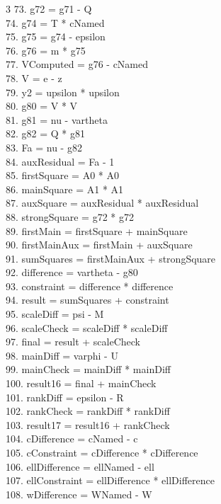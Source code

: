 \documentclass[10pt]{article}
\begin{document}
\begin{multicols}{3}
73. g72 = g71 - Q\\
74. g74 = T * cNamed\\
75. g75 = g74 - epsilon\\
76. g76 = m * g75\\
77. VComputed = g76 - cNamed\\
78. V = e - z\\
79. y2 = upsilon * upsilon\\
80. g80 = V * V\\
81. g81 = nu - vartheta\\
82. g82 = Q * g81\\
83. Fa = nu - g82\\
84. auxResidual = Fa - 1\\
85. firstSquare = A0 * A0\\
86. mainSquare = A1 * A1\\
87. auxSquare = auxResidual * auxResidual\\
88. strongSquare = g72 * g72\\
89. firstMain = firstSquare + mainSquare\\
90. firstMainAux = firstMain + auxSquare\\
91. sumSquares = firstMainAux + strongSquare\\
92. difference = vartheta - g80\\
93. constraint = difference * difference\\
94. result = sumSquares + constraint\\
95. scaleDiff = psi - M\\
96. scaleCheck = scaleDiff * scaleDiff\\
97. final = result + scaleCheck\\
98. mainDiff = varphi - U\\
99. mainCheck = mainDiff * mainDiff\\
100. result16 = final + mainCheck\\
101. rankDiff = epsilon - R\\
102. rankCheck = rankDiff * rankDiff\\
103. result17 = result16 + rankCheck\\
104. cDifference = cNamed - c\\
105. cConstraint = cDifference * cDifference\\
106. ellDifference = ellNamed - ell\\
107. ellConstraint = ellDifference * ellDifference\\
108. wDifference = WNamed - W\\

\end{multicols}
\end{document}
